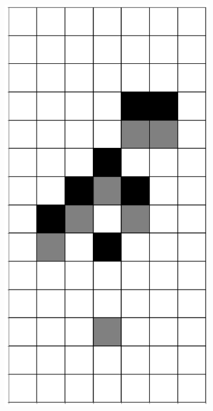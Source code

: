 \documentclass[12pt]{article}
\numberwithin{figure}{section} %
\begin{document}
\begin{figure}[H]
        \begin{subfigure}{0.18\textwidth}
     		\centering
     		\includegraphics[width=\linewidth]{Section4/16.2}
     		\subcaption{}
   	\end{subfigure}
        	\begin{subfigure}{0.18\textwidth}

\end{subfigure}
\end{figure}
\end{document}
